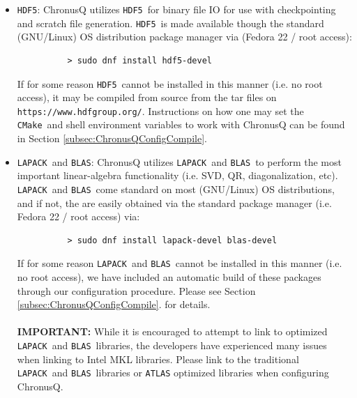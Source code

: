 \documentclass[12pt]{article}
\newcommand{\CMake}{\texttt{CMake}}
\newcommand{\HDF}{\texttt{HDF5}}
\newcommand{\LAPACK}{\texttt{LAPACK}}
\newcommand{\BLAS}{\texttt{BLAS}}
\newcommand{\Python}{\texttt{Python}}
\begin{document}
\begin{itemize}
	\begin{lstlisting}
          > sudo dnf install python-devel libxml2-devel libxslt-devel
	\end{lstlisting}
        To parse the input file, ChrounusQ relies on the \Python~module 
	\texttt{ConfigParser}. One may obtain \texttt{ConfigParser} through
	the \Python~\texttt{pip} module via:
	 
	\begin{lstlisting}
	  > pip install configparser
	\end{lstlisting}

      \item \HDF: ChronusQ utilizes \HDF~for binary file IO for use with 
        checkpointing and scratch file generation. \HDF~is made available
	though the standard (GNU/Linux) OS distribution package manager via
	(Fedora 22 / root access):

	\begin{lstlisting}
          > sudo dnf install hdf5-devel
	\end{lstlisting}
	If for some reason \HDF~cannot be installed in this manner (i.e. no
	root access), it may be compiled from source from the tar files on
	\texttt{https://www.hdfgroup.org/}. Instructions on how one may set
	the \CMake~and shell environment variables to work with ChronusQ
	can be found in Section \ref{subsec:ChronusQConfigCompile}.

      \item \LAPACK~and \BLAS: ChronusQ utilizes \LAPACK~and \BLAS~to perform
        the most important linear-algebra functionality (i.e. SVD, QR, 
	diagonalization, etc). \LAPACK~and \BLAS~come standard on most
	(GNU/Linux) OS distributions, and if not, the are easily obtained via
	the standard package manager (i.e. Fedora 22 / root access) via:

	\begin{lstlisting}
          > sudo dnf install lapack-devel blas-devel
	\end{lstlisting}
	If for some reason \LAPACK~and \BLAS~cannot be installed in this manner 
	(i.e. no root access), we have included an automatic build of these packages
	through our configuration procedure. Please see Section 
	\ref{subsec:ChronusQConfigCompile}. for details.\\
	\\
	\textbf{IMPORTANT:} While it is encouraged to attempt to link to optimized
	\LAPACK~and \BLAS~libraries, the developers have experienced many issues 
	when linking to Intel MKL libraries. Please link to the traditional
	\LAPACK~and \BLAS~libraries or \texttt{ATLAS} optimized libraries when
	configuring ChronusQ.

    \end{itemize}
\end{document}

